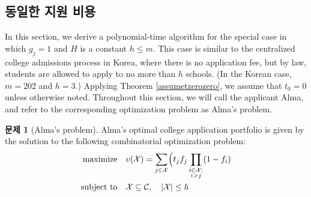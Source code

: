 \documentclass[12pt]{article} %
\newif\ifen
\theoremstyle{definition}
\newtheorem{problem}{Problem}
\theoremstyle{definition}
\newtheorem{problem}{문제}
\begin{document}
\ifen \section{Homogeneous application costs}  \else \subsection{동일한 지원 비용} \fi \label{homogappcosts}
In this section, we derive a polynomial-time algorithm for the special case in which $g_j = 1$ and $H$ is a constant $h \leq m$. This case is similar to the centralized college admissions process in Korea, where there is no application fee, but by law, students are allowed to apply to no more than $h$ schools. (In the Korean case, $m=202$ and $h=3$.) Applying Theorem \ref{assumetzerozero}, we assume that $t_0 = 0$ unless otherwise noted. Throughout this section, we will call the applicant Alma, and refer to the corresponding optimization problem as Alma's problem. 

\begin{problem}[Alma’s problem]
Alma's optimal college application portfolio is given by the solution to the following combinatorial optimization problem:
\begin{align}
\begin{split}
\text{maximize}\quad &  v(\mathcal{X}) = \sum_{j\in
\mathcal{X}} \Bigl( t_j f_j  \prod_{\substack{i \in \mathcal{X}: \\ i > j}} (1 - f_{i})\\
\text{subject to}\quad & \mathcal{X}\subseteq\mathcal{C}, \quad|\mathcal{X}| \leq h 
\end{split}
\end{align}
\end{problem}
\end{document}
